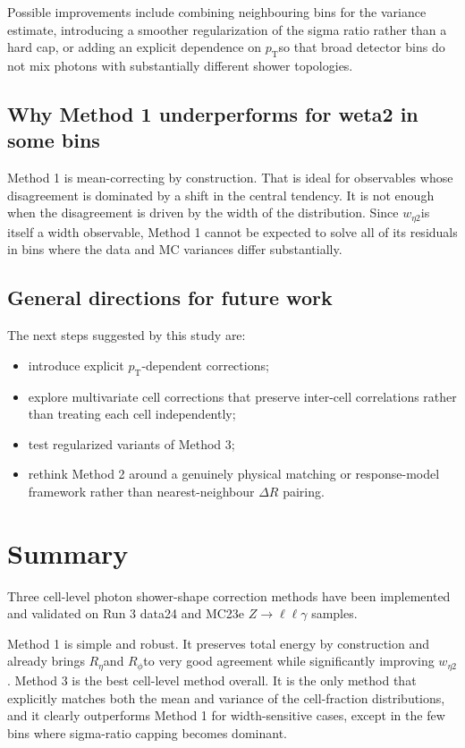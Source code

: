 \documentclass[11pt,a4paper]{article}
\newcommand{\Reta}{\ensuremath{R_{\eta}}}
\newcommand{\Rphi}{\ensuremath{R_{\phi}}}
\newcommand{\weta}{\ensuremath{w_{\eta 2}}}
\newcommand{\pt}{\ensuremath{p_{\mathrm{T}}}}
\begin{document}
Possible improvements include combining neighbouring bins for the variance
estimate, introducing a smoother regularization of the sigma ratio rather than a
hard cap, or adding an explicit dependence on \pt so that broad detector bins do
not mix photons with substantially different shower topologies.

\subsection{Why Method 1 underperforms for weta2 in some bins}

Method 1 is mean-correcting by construction. That is ideal for observables whose
disagreement is dominated by a shift in the central tendency. It is not enough
when the disagreement is driven by the width of the distribution. Since \weta is
itself a width observable, Method 1 cannot be expected to solve all of its
residuals in bins where the data and MC variances differ substantially.

\subsection{General directions for future work}

The next steps suggested by this study are:

\begin{itemize}
  \item introduce explicit \pt-dependent corrections;
  \item explore multivariate cell corrections that preserve inter-cell
  correlations rather than treating each cell independently;
  \item test regularized variants of Method 3;
  \item rethink Method 2 around a genuinely physical matching or response-model
  framework rather than nearest-neighbour $\Delta R$ pairing.
\end{itemize}

\section{Summary}

Three cell-level photon shower-shape correction methods have been implemented
and validated on Run 3 data24 and MC23e $Z \to \ell\ell\gamma$ samples.

Method 1 is simple and robust. It preserves total energy by construction and
already brings \Reta and \Rphi to very good agreement while significantly
improving \weta. Method 3 is the best cell-level method overall. It is the only
method that explicitly matches both the mean and variance of the cell-fraction
distributions, and it clearly outperforms Method 1 for width-sensitive cases,
except in the few bins where sigma-ratio capping becomes dominant.
\end{document}
